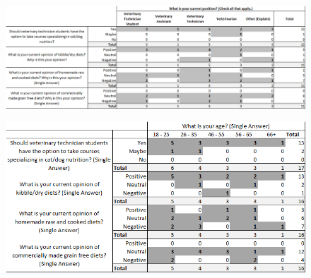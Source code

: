     \begin{figure}[htbp] \centering
    \includegraphics[width=1.3\textwidth, angle=90]{Images/Crosstab1.png}
    \label{mgraph}
    \end{figure}
    \begin{figure}[htbp] \centering
    \includegraphics[width=1.1\textwidth, angle=90]{Images/Crosstab2.png}
    \label{mgraph2}
    \end{figure}
    
